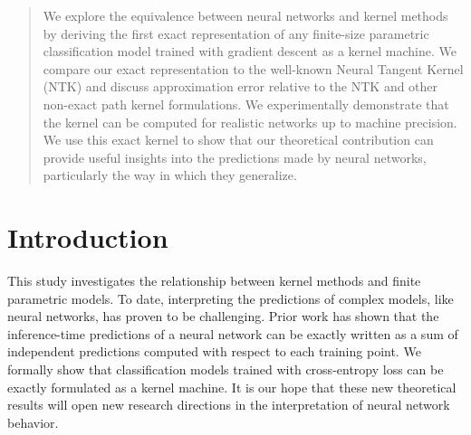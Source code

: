 





\begin{abstract}
We explore the equivalence between neural networks and kernel methods by deriving the first exact representation of any finite-size parametric classification model trained with gradient descent as a kernel machine. We compare our exact representation to the well-known Neural Tangent Kernel (NTK) and discuss approximation error relative to the NTK and other non-exact path kernel formulations. We experimentally demonstrate that the kernel can be computed for realistic networks up to machine precision. We use this exact kernel to show that our theoretical contribution can provide useful insights into the predictions made by neural networks, particularly the way in which they generalize.
\end{abstract}

\section{Introduction}

This study investigates the relationship between kernel methods and finite parametric models. To date, interpreting the predictions of complex models, like neural networks, has proven to be challenging. Prior work has shown that the inference-time predictions of a neural network can be exactly written as a sum of independent predictions computed with respect to each training point. We formally show that classification models trained with cross-entropy loss can be exactly formulated as a kernel machine. It is our hope that these new theoretical results will open new research directions in the interpretation of neural network behavior.





